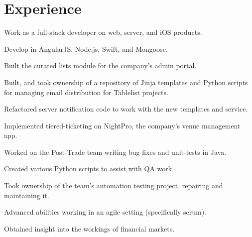 \documentclass[]{resume}
\begin{document}
\begin{minipage}[t]{0.66\textwidth}


\section{Experience}

\vspace{\topsep} %
\begin{tightemize} \item Work as a full-stack developer on web, server, and iOS products. \item Develop in AngularJS, Node.js, Swift, and Mongoose. \item Built the curated lists module for the company's admin portal. \item Built, and took ownership of a repository of Jinja templates and Python scripts for managing email distribution for Tablelist projects.  \item Refactored server notification code to work with the new templates and service. \item Implemented tiered-ticketing on NightPro, the company's venue management app. \end{tightemize}
\sectionsep

\begin{tightemize} \item Worked on the Post-Trade team writing bug fixes and unit-tests in Java. \item Created various Python scripts to assist with QA work. \item Took ownership of the team's automation testing project, repairing and maintaining it. \item Advanced abilities working in an agile setting (specifically scrum).  \item Obtained insight into the workings of financial markets. \end{tightemize}
\sectionsep


\end{minipage}
\end{document}
